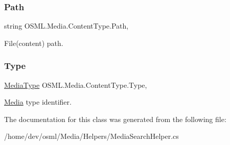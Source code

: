 \subsubsection{\texorpdfstring{Path}{Path}}
{\footnotesize\ttfamily string O\+S\+M\+L.\+Media.\+Content\+Type.\+Path\hspace{0.3cm}{\ttfamily [get]}, {\ttfamily [set]}}



File(content) path. 

\mbox{\label{classOSML_1_1Media_1_1ContentType_a62715596eaea8956f5df45e74b157a45}} 
\subsubsection{\texorpdfstring{Type}{Type}}
{\footnotesize\ttfamily \mbox{\hyperlink{namespaceOSML_1_1Media_aa3e4261aa5181fcc93920ffe409e8b02}{Media\+Type}} O\+S\+M\+L.\+Media.\+Content\+Type.\+Type\hspace{0.3cm}{\ttfamily [get]}, {\ttfamily [set]}}



\mbox{\hyperlink{classOSML_1_1Media_1_1Media}{Media}} type identifier. 



The documentation for this class was generated from the following file\+:\begin{DoxyCompactItemize}
\item 
/home/dev/osml/\+Media/\+Helpers/Media\+Search\+Helper.\+cs\end{DoxyCompactItemize}
